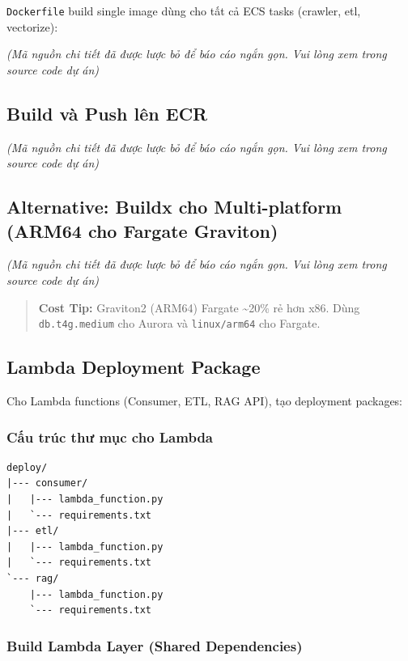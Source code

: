 \texttt{Dockerfile} build single image dùng cho tất cả ECS tasks
(crawler, etl, vectorize):

\emph{(Mã nguồn chi tiết đã được lược bỏ để báo cáo ngắn gọn. Vui lòng
xem trong source code dự án)}

\hypertarget{build-vuxe0-push-luxean-ecr}{%
\subsection{Build và Push lên ECR}}

\emph{(Mã nguồn chi tiết đã được lược bỏ để báo cáo ngắn gọn. Vui lòng
xem trong source code dự án)}

\hypertarget{alternative-buildx-cho-multi-platform-arm64-cho-fargate-graviton}{%
\subsection{Alternative: Buildx cho Multi-platform (ARM64 cho Fargate
Graviton)}}

\emph{(Mã nguồn chi tiết đã được lược bỏ để báo cáo ngắn gọn. Vui lòng
xem trong source code dự án)}

\begin{quote}
\textbf{Cost Tip:} Graviton2 (ARM64) Fargate \textasciitilde20\% rẻ hơn
x86. Dùng \texttt{db.t4g.medium} cho Aurora và \texttt{linux/arm64} cho
Fargate.
\end{quote}

\hypertarget{lambda-deployment-package}{%
\subsection{Lambda Deployment Package}}

Cho Lambda functions (Consumer, ETL, RAG API), tạo deployment packages:

\hypertarget{cux1ea5u-truxfac-thux1b0-mux1ee5c-cho-lambda}{%
\subsubsection{Cấu trúc thư mục cho
Lambda}}

\begin{verbatim}
deploy/
|--- consumer/
|   |--- lambda_function.py
|   `--- requirements.txt
|--- etl/
|   |--- lambda_function.py
|   `--- requirements.txt
`--- rag/
    |--- lambda_function.py
    `--- requirements.txt
\end{verbatim}

\hypertarget{build-lambda-layer-shared-dependencies}{%
\subsubsection{Build Lambda Layer (Shared
Dependencies)}}

